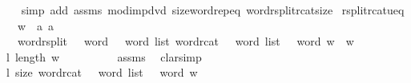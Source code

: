 \begin{isabellebody}
%
\isadelimproof
\ \ %
\endisadelimproof
%
\isatagproof
{}\isamarkupfalse%
\ {\isacharparenleft}{\kern0pt}simp\ add{\isacharcolon}{\kern0pt}\ assms\ mod{\isacharunderscore}{\kern0pt}{}{\isacharunderscore}{\kern0pt}imp{\isacharunderscore}{\kern0pt}dvd\ size{\isacharunderscore}{\kern0pt}word{\isachardot}{\kern0pt}rep{\isacharunderscore}{\kern0pt}eq\ word{\isacharunderscore}{\kern0pt}rsplit{\isacharunderscore}{\kern0pt}rcat{\isacharunderscore}{\kern0pt}size{\isacharparenright}{\kern0pt}%
\endisatagproof
{\isafoldproof}%
%
\isadelimproof
\isanewline
%
\endisadelimproof
\isanewline
{}\isamarkupfalse%
\ rsplit{\isacharunderscore}{\kern0pt}rcat{\isacharunderscore}{\kern0pt}u{}{}{\isacharunderscore}{\kern0pt}eq{\isacharcolon}{\kern0pt}\isanewline
\ \ \ {\isachardoublequoteopen}w\ {\isacharequal}{\kern0pt}\ {\isacharbrackleft}{\kern0pt}a{}{\isacharcomma}{\kern0pt}\ a{}{\isacharbrackright}{\kern0pt}{\isachardoublequoteclose}\isanewline
\ \ \ {\isachardoublequoteopen}{\isacharparenleft}{\kern0pt}word{\isacharunderscore}{\kern0pt}rsplit\ {\isacharcolon}{\kern0pt}{\isacharcolon}{\kern0pt}\ {}{}\ word\ {\isasymRightarrow}\ {}\ word\ list{\isacharparenright}{\kern0pt}\ {\isacharparenleft}{\kern0pt}{\isacharparenleft}{\kern0pt}word{\isacharunderscore}{\kern0pt}rcat\ {\isacharcolon}{\kern0pt}{\isacharcolon}{\kern0pt}\ {}\ word\ list\ {\isasymRightarrow}\ {}{}\ word{\isacharparenright}{\kern0pt}\ w{\isacharparenright}{\kern0pt}\ {\isacharequal}{\kern0pt}\ w{\isachardoublequoteclose}\isanewline
%
\isadelimproof
%
\endisadelimproof
%
\isatagproof
{}\isamarkupfalse%
\ {\isacharminus}{\kern0pt}\isanewline
\ \ \isamarkupfalse%
\ l{}{\isacharcolon}{\kern0pt}\ {\isachardoublequoteopen}length\ w\ {\isacharasterisk}{\kern0pt}\ {}\ {\isacharequal}{\kern0pt}\ {}{}{\isachardoublequoteclose}\isanewline
\ \ \ \ \isamarkupfalse%
\ assms\ \isamarkupfalse%
\ clarsimp\isanewline
\ \ \isamarkupfalse%
\ \isamarkupfalse%
\ l{}{\isacharcolon}{\kern0pt}\ {\isachardoublequoteopen}size\ {\isacharparenleft}{\kern0pt}{\isacharparenleft}{\kern0pt}word{\isacharunderscore}{\kern0pt}rcat\ {\isacharcolon}{\kern0pt}{\isacharcolon}{\kern0pt}\ {}\ word\ list\ {\isasymRightarrow}\ {}{}\ word{\isacharparenright}{\kern0pt}\ w{\isacharparenright}{\kern0pt}\ {\isacharequal}{\kern0pt}\ {}{}{\isachardoublequoteclose}\isanewline

\end{isabellebody}

